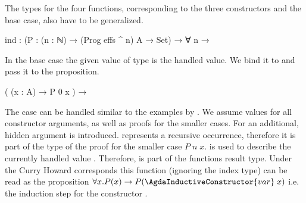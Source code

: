 The types for the four functions, corresponding to the three constructors and
the base case, also have to be generalized.

\begin{code}
ind : (P : (n : ℕ) → (Prog effs ^ n) A → Set) → ∀ n →
\end{code}
In the base case the given value of type  is the handled value.
We bind it to  and pass it to the proposition.
\begin{code}
  (                (x : A)                                        → P 0 x                     )  →
\end{code}
The  case can be handled similar to the examples by
\textcite{DBLP:journals/corr/abs-1806-05230}.
We assume values for all constructor arguments, as well as proofs for the
smaller cases.
For  an additional, hidden argument
 is introduced.
 represents a recursive occurrence, therefore it is part of the
type of the proof for the smaller case $P\;n\;x$.
 is used to describe the currently handled value
\AgdaSpace{}.
Therefore, \AgdaSpace{} is part of
the functions result type.
Under the Curry Howard corresponds this function (ignoring the index type) can
be read as the proposition
$\forall x. P(x) \rightarrow P(\AgdaInductiveConstructor{var}\;x)$
i.e. the induction step for the constructor .
